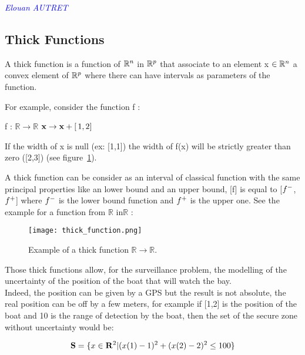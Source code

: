 \vspace{0.5 cm}
\textcolor{blue} {\textit{Elouan AUTRET}}
\vspace{0.3 cm}
\subsection{Thick Functions}

A thick function is a function of $\mathbb{R^{\textnormal{\ensuremath{n}}}}$ in $\mathbb{R^{\textnormal{\ensuremath{p}}}}$ that associate to an element x $\in \mathbb{R^{\textnormal{\ensuremath{n}}}}$ a convex element of $\mathbb{R^{\textnormal{\ensuremath{p}}}}$ where there can have intervals as parameters of the function.

For example, consider the function f :
\begin{algorithmic}[H]
\STATE f :  $\mathbb{R} \rightarrow \mathbb{R} $
\STATE $\mathbf{x} \rightarrow \mathbf{x}+ \mathbb{[ \,\textnormal{1},\textnormal{2}] \,}$
\end{algorithmic}

If the width of x is null (ex: [1,1]) the width of f(x) will be strictly greater than zero ([2,3]) (see figure~\ref{fig:thickFunction}).

A thick function can be consider as an interval of classical function with the same principal properties like an lower bound and an upper bound, [f] is equal to [$f^{\textnormal{\ensuremath{-}}}$,$f^{\textnormal{\ensuremath{+}}}$]  where $f^{\textnormal{\ensuremath{-}}}$ is the lower bound function and $f^{\textnormal{\ensuremath{+}}}$ is the upper one. See the example for  a function from $\mathbb{R} $ in$ \mathbb{R} $ :

\begin{figure}[H]
\centering
    \texttt{[image: thick\_function.png]}
    \caption{Example of a thick function  $\mathbb{R} \rightarrow \mathbb{R} $.}
    \label{fig:thickFunction}
\end{figure}

Those thick functions allow, for the surveillance problem, the modelling of the uncertainty of
the position of the boat that will watch the bay.\\
Indeed, the position can be given by a GPS but the result is not absolute, the real position can be off by a few meters, for example if [1,2] is the position of the boat and 10 is the range of detection by the boat, then the set of the secure zone without uncertainty would be:

\begin{equation}
 \mathbf{S} = \{ x \in \mathbf{R}^{\textnormal{\ensuremath{2}}} | (x(1)-1)^{\textnormal{\ensuremath{2}}} + (x(2)-2)^{\textnormal{\ensuremath{2}}} \leq 100 \}  \label{eqDIST}
\end{equation}

